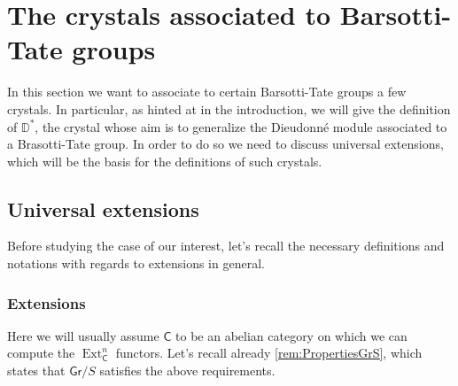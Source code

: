 \section{The crystals associated to Barsotti-Tate groups}
In this section we want to associate to certain Barsotti-Tate groups
a few crystals.
In particular, as hinted at in the introduction, we will give the definition
of $\mathbb{D}^*$, the crystal whose aim is to generalize the Dieudonné module
associated to a Brasotti-Tate group.
In order to do so we need to discuss universal extensions, which will be the basis
for the definitions of such crystals.



\subsection{Universal extensions}
Before studying the case of our interest, let's recall the necessary definitions
and notations with regards to extensions in general.



\subsubsection{Extensions}
Here we will usually assume $\mathsf{C}$ to be an abelian category on which
we can compute the $\operatorname{Ext}^n_{\mathsf{C}}$ functors.
Let's recall already \cref{rem:PropertiesGrS}, which states that $\mathsf{Gr}/S$
satisfies the above requirements.


